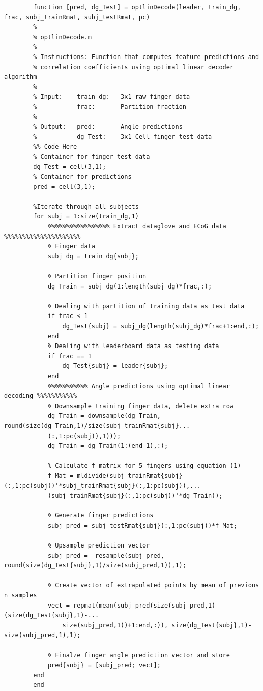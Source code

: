 \documentclass{article}
\begin{document}
	\begin{lstlisting}
		function [pred, dg_Test] = optlinDecode(leader, train_dg, frac, subj_trainRmat, subj_testRmat, pc)
	    %
	    % optlinDecode.m
	    %
	    % Instructions: Function that computes feature predictions and
	    % correlation coefficients using optimal linear decoder algorithm
	    %
	    % Input:    train_dg:   3x1 raw finger data
	    %           frac:       Partition fraction
	    %
	    % Output:   pred:       Angle predictions
	    %           dg_Test:    3x1 Cell finger test data
		%% Code Here
		% Container for finger test data
		dg_Test = cell(3,1);
		% Container for predictions
		pred = cell(3,1);

		%Iterate through all subjects
		for subj = 1:size(train_dg,1)
		    %%%%%%%%%%%%%%%%% Extract dataglove and ECoG data %%%%%%%%%%%%%%%%%%%%%
		    % Finger data
		    subj_dg = train_dg{subj};
		    
		    % Partition finger position
		    dg_Train = subj_dg(1:length(subj_dg)*frac,:);
		    
		    % Dealing with partition of training data as test data
		    if frac < 1
		        dg_Test{subj} = subj_dg(length(subj_dg)*frac+1:end,:);
		    end
		    % Dealing with leaderboard data as testing data
		    if frac == 1
		        dg_Test{subj} = leader{subj};
		    end
		    %%%%%%%%%%% Angle predictions using optimal linear decoding %%%%%%%%%%%
		    % Downsample training finger data, delete extra row 
		    dg_Train = downsample(dg_Train, round(size(dg_Train,1)/size(subj_trainRmat{subj}...
		    (:,1:pc(subj)),1)));
		    dg_Train = dg_Train(1:(end-1),:);
		    
		    % Calculate f matrix for 5 fingers using equation (1)
		    f_Mat = mldivide(subj_trainRmat{subj}(:,1:pc(subj))'*subj_trainRmat{subj}(:,1:pc(subj)),...
		    (subj_trainRmat{subj}(:,1:pc(subj))'*dg_Train));
		    
		    % Generate finger predictions
		    subj_pred = subj_testRmat{subj}(:,1:pc(subj))*f_Mat;
		    
		    % Upsample prediction vector
		    subj_pred =  resample(subj_pred, round(size(dg_Test{subj},1)/size(subj_pred,1)),1);
		    
		    % Create vector of extrapolated points by mean of previous n samples 
		    vect = repmat(mean(subj_pred(size(subj_pred,1)-(size(dg_Test{subj},1)-...
		        size(subj_pred,1))+1:end,:)), size(dg_Test{subj},1)-size(subj_pred,1),1);
		    
		    % Finalze finger angle prediction vector and store
		    pred{subj} = [subj_pred; vect];    
		end
		end
	\end{lstlisting}
\end{document}
